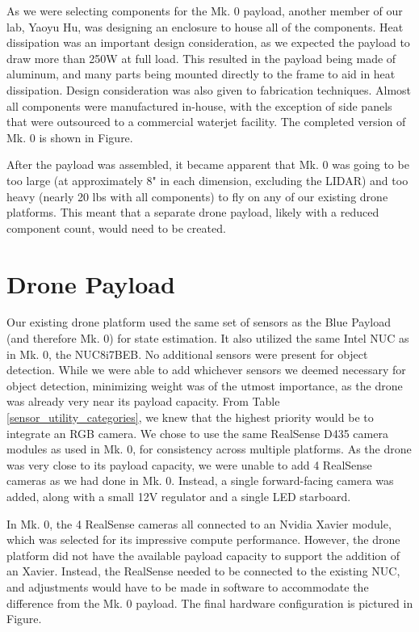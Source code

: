 As we were selecting components for the Mk. 0 payload, another member of our lab, Yaoyu Hu, was designing an enclosure to house all of the components. Heat dissipation was an important design consideration, as we expected the payload to draw more than 250W at full load. This resulted in the payload being made of aluminum, and many parts being mounted directly to the frame to aid in heat dissipation. Design consideration was also given to fabrication techniques. Almost all components were manufactured in-house, with the exception of side panels that were outsourced to a commercial waterjet facility. The completed version of Mk. 0 is shown in Figure.

After the payload was assembled, it became apparent that Mk. 0 was going to be too large (at approximately 8" in each dimension, excluding the LIDAR) and too heavy (nearly 20 lbs with all components) to fly on any of our existing drone platforms. This meant that a separate drone payload, likely with a reduced component count, would need to be created.

\section{Drone Payload}

Our existing drone platform used the same set of sensors as the Blue Payload (and therefore Mk. 0) for state estimation. It also utilized the same Intel NUC as in Mk. 0, the NUC8i7BEB. No additional sensors were present for object detection. While we were able to add whichever sensors we deemed necessary for object detection, minimizing weight was of the utmost importance, as the drone was already very near its payload capacity. From Table \ref{sensor_utility_categories}, we knew that the highest priority would be to integrate an RGB camera. We chose to use the same RealSense D435 camera modules as used in Mk. 0, for consistency across multiple platforms. As the drone was very close to its payload capacity, we were unable to add 4 RealSense cameras as we had done in Mk. 0. Instead, a single forward-facing camera was added, along with a small 12V regulator and a single LED starboard.

In Mk. 0, the 4 RealSense cameras all connected to an Nvidia Xavier module, which was selected for its impressive compute performance. However, the drone platform did not have the available payload capacity to support the addition of an Xavier. Instead, the RealSense needed to be connected to the existing NUC, and adjustments would have to be made in software to accommodate the difference from the Mk. 0 payload. The final hardware configuration is pictured in Figure.

